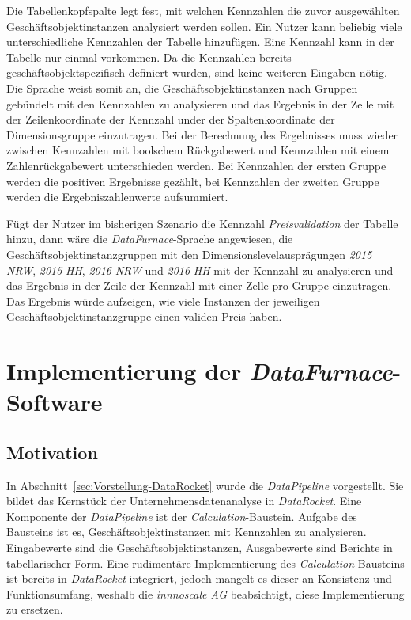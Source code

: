 \documentclass[
  language=german, %
  type=bachelor,%
  ngerman
]{isthesis}
\begin{document}
\begin{content}
  Die Tabellenkopfspalte legt fest, mit welchen Kennzahlen die zuvor
  ausgewählten Geschäftsobjektinstanzen analysiert werden sollen. Ein Nutzer
  kann beliebig viele unterschiedliche Kennzahlen der Tabelle hinzufügen. Eine
  Kennzahl kann in der Tabelle nur einmal vorkommen. Da die Kennzahlen bereits
  geschäftsobjektspezifisch definiert wurden, sind keine weiteren Eingaben
  nötig. Die Sprache weist somit an, die Geschäftsobjektinstanzen nach Gruppen
  gebündelt mit den Kennzahlen zu analysieren und das Ergebnis in der Zelle mit
  der Zeilenkoordinate der Kennzahl under der Spaltenkoordinate der
  Dimensionsgruppe einzutragen. Bei der Berechnung des Ergebnisses muss wieder
  zwischen Kennzahlen mit boolschem Rückgabewert und Kennzahlen mit einem
  Zahlenrückgabewert unterschieden werden. Bei Kennzahlen der ersten
  Gruppe werden die positiven Ergebnisse gezählt, bei Kennzahlen der zweiten
  Gruppe werden die Ergebniszahlenwerte aufsummiert.
  
  Fügt der Nutzer im bisherigen Szenario die
  Kennzahl \textit{Preisvalidation} der Tabelle hinzu, dann wäre die
  \textit{DataFurnace}-Sprache angewiesen, die Geschäftsobjektinstanzgruppen
  mit den Dimensionslevelausprägungen \textit{2015} \textit{NRW}, \textit{2015}
  \textit{HH}, \textit{2016} \textit{NRW} und \textit{2016} \textit{HH} mit der
  Kennzahl zu analysieren und das Ergebnis in der Zeile der Kennzahl mit einer
  Zelle pro Gruppe einzutragen. Das Ergebnis würde aufzeigen, wie viele Instanzen der
  jeweiligen Geschäftsobjektinstanzgruppe einen validen Preis haben.



  \chapter{Implementierung der \textit{DataFurnace}-Software}\label{ch:implementierung-datafurnace}

  \section{Motivation}
  In Abschnitt~\ref{sec:Vorstellung-DataRocket} wurde die \textit{DataPipeline}
  vorgestellt. Sie bildet das Kernstück der Unternehmensdatenanalyse in
  \textit{DataRocket}. Eine Komponente der \textit{DataPipeline} ist der
  \textit{Calculation}-Baustein.  Aufgabe des Bausteins ist es,
  Geschäftsobjektinstanzen mit Kennzahlen zu analysieren. Eingabewerte sind die
  Geschäftsobjektinstanzen, Ausgabewerte sind Berichte in tabellarischer Form.
  Eine rudimentäre Implementierung des \textit{Calculation}-Bausteins ist
  bereits in \textit{DataRocket} integriert, jedoch mangelt es dieser an
  Konsistenz und Funktionsumfang, weshalb die \textit{innnoscale AG}
  beabsichtigt, diese Implementierung zu ersetzen.


\end{content}
\end{document}

